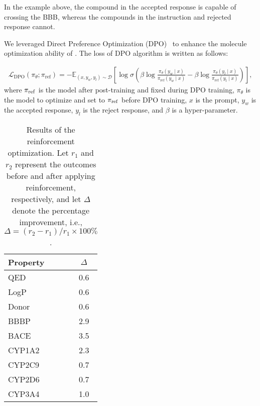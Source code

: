In the example above, the compound in the accepted response is capable of crossing the BBB, whereas the compounds in the instruction and rejected response cannot.

We leveraged Direct Preference Optimization (DPO)~\cite{rafailov2024direct} to enhance the molecule optimization ability of \ourM{}. The loss of DPO algorithm is written as follows:

\begin{align}
    \mathcal{L}_{\text{DPO}}(\pi_\theta; \pi_{\text{ref}}) = -\mathbb{E}_{(x, y_w, y_l) \sim \mathcal{D}} \left[ \log \sigma \left( \beta \log \frac{\pi_\theta(y_w \mid x)}{\pi_{\text{ref}}(y_w \mid x)} - \beta \log \frac{\pi_\theta(y_l \mid x)}{\pi_{\text{ref}}(y_l \mid x)} \right) \right],
\end{align}
where $\pi_{\rm ref}$ is the model after post-training and fixed during DPO training, $\pi_\theta$ is the model to optimize and set to $\pi_{\rm ref}$ before DPO training, $x$ is the prompt, $y_w$ is the accepted response, $y_l$ is the reject response, and $\beta$ is a hyper-parameter. 
 

\begin{table}[h]
\centering
\begin{tabular}{lc}
\toprule
Property & $\Delta$  \\
\midrule
QED  & 0.6 \\
LogP  & 0.6 \\
Donor  & 0.6 \\
BBBP  & 2.9 \\
BACE  & 3.5 \\
CYP1A2  & 2.3 \\
CYP2C9  & 0.7 \\
CYP2D6  & 0.7 \\
CYP3A4  & 1.0 \\
\bottomrule
\end{tabular}
\caption{Results of the reinforcement optimization. Let $r_1$ and $r_2$ represent the outcomes before and after applying reinforcement, respectively, and let $\Delta$ denote the percentage improvement, i.e., $\Delta = (r_2 - r_1)/r_1 \times 100\%$. }
\label{tab:dpo-result}
\end{table}


